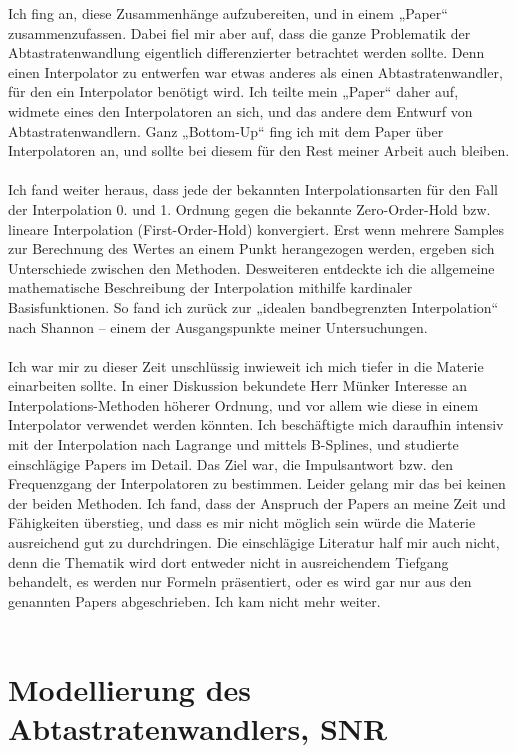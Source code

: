 \documentclass[11pt]{article}
\begin{document}
Ich fing an, diese Zusammenhänge aufzubereiten, und in einem „Paper“ zusammenzufassen. Dabei fiel mir aber auf, dass die ganze Problematik der Abtastratenwandlung eigentlich differenzierter betrachtet werden sollte. Denn einen Interpolator zu entwerfen war etwas anderes als einen Abtastratenwandler, für den ein Interpolator benötigt wird. Ich teilte mein „Paper“ daher auf, widmete eines den Interpolatoren an sich, und das andere dem Entwurf von Abtastratenwandlern.
Ganz „Bottom-Up“ fing ich mit dem Paper über Interpolatoren an, und sollte bei diesem für den Rest meiner Arbeit auch bleiben.\\
\\
Ich fand weiter heraus, dass jede der bekannten Interpolationsarten für den Fall der Interpolation 0. und 1. Ordnung gegen die bekannte Zero-Order-Hold bzw. lineare Interpolation (First-Order-Hold) konvergiert. Erst wenn mehrere Samples zur Berechnung des Wertes an einem Punkt herangezogen werden, ergeben sich Unterschiede zwischen den Methoden. Desweiteren entdeckte ich die allgemeine mathematische Beschreibung der Interpolation mithilfe kardinaler Basisfunktionen. So fand ich zurück zur „idealen bandbegrenzten Interpolation“ nach Shannon – einem der Ausgangspunkte meiner Untersuchungen.\\
\\
Ich war mir zu dieser Zeit unschlüssig inwieweit ich mich tiefer in die Materie einarbeiten sollte. In einer Diskussion bekundete Herr Münker Interesse an Interpolations-Methoden höherer Ordnung, und vor allem wie diese in einem Interpolator verwendet werden könnten. Ich beschäftigte mich daraufhin intensiv mit der Interpolation nach Lagrange und mittels B-Splines, und studierte einschlägige Papers im Detail. Das Ziel war, die Impulsantwort bzw. den Frequenzgang der Interpolatoren zu bestimmen. Leider gelang mir das bei keinen der beiden Methoden. Ich fand, dass der Anspruch der Papers an meine Zeit und Fähigkeiten überstieg, und dass es mir nicht möglich sein würde die Materie ausreichend gut zu durchdringen. Die einschlägige Literatur half mir auch nicht, denn die Thematik wird dort entweder nicht in ausreichendem Tiefgang behandelt, es werden nur Formeln präsentiert, oder es wird gar nur aus den genannten Papers abgeschrieben. Ich kam nicht mehr weiter.\\
\\

\section{Modellierung des Abtastratenwandlers, SNR}
\end{document}
